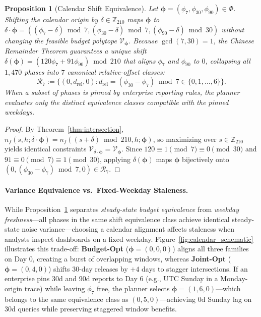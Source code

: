 \documentclass[sigconf, nonacm]{acmart}
\newtheorem{proposition}{Proposition}
\begin{document}
\begin{proposition}[Calendar Shift Equivalence]
\label{prop:orbits}
Let $\boldsymbol{\phi} = (\phi_7, \phi_{30}, \phi_{90}) \in \Phi$. Shifting the calendar origin by $\delta \in \mathbb{Z}_{210}$ maps $\boldsymbol{\phi}$ to $\delta \cdot \boldsymbol{\phi} = ((\phi_7 - \delta) \bmod 7, (\phi_{30} - \delta) \bmod 7, (\phi_{90} - \delta) \bmod 30)$ without changing the feasible budget polytope $\mathcal{V}_{\boldsymbol{\phi}}$. Because $\gcd(7, 30) = 1$, the Chinese Remainder Theorem guarantees a unique shift $\delta(\boldsymbol{\phi}) = (120\phi_7 + 91\phi_{90}) \bmod 210$ that aligns $\phi_7$ and $\phi_{90}$ to $0$, collapsing all $1{,}470$ phases into $7$ canonical relative-offset classes:
\[
\mathcal{R}_7 := \big\{(0, d_{\mathrm{rel}}, 0) : d_{\mathrm{rel}} = (\phi_{30} - \phi_7) \bmod 7 \in \{0, 1, \dots, 6\}\big\}.
\]
When a subset of phases is pinned by enterprise reporting rules, the planner evaluates only the distinct equivalence classes compatible with the pinned weekdays.
\end{proposition}
\begin{proof}
By Theorem~\ref{thm:intersection}, $n_f(s, h; \delta \cdot \boldsymbol{\phi}) = n_f((s + \delta) \bmod 210, h; \boldsymbol{\phi})$, so maximizing over $s \in \mathbb{Z}_{210}$ yields identical constraints $\mathcal{V}_{\delta \cdot \boldsymbol{\phi}} = \mathcal{V}_{\boldsymbol{\phi}}$. Since $120 \equiv 1 \pmod 7 \equiv 0 \pmod{30}$ and $91 \equiv 0 \pmod 7 \equiv 1 \pmod{30}$, applying $\delta(\boldsymbol{\phi})$ maps $\boldsymbol{\phi}$ bijectively onto $(0, (\phi_{30} - \phi_7) \bmod 7, 0) \in \mathcal{R}_7$.
\end{proof}

\paragraph{Variance Equivalence vs.\ Fixed-Weekday Staleness.}
While Proposition~\ref{prop:orbits} separates \emph{steady-state budget equivalence} from \emph{weekday freshness}---all phases in the same shift equivalence class achieve identical steady-state noise variance---choosing a calendar alignment affects staleness when analysts inspect dashboards on a fixed weekday. Figure~\ref{fig:calendar_schematic} illustrates this trade-off: \textbf{Budget-Opt} ($\boldsymbol{\phi}=(0,0,0)$) aligns all three families on Day 0, creating a burst of overlapping windows, whereas \textbf{Joint-Opt} ($\boldsymbol{\phi}=(0,4,0)$) shifts 30-day releases by $+4$ days to stagger intersections. If an enterprise pins 30d and 90d reports to Day 6 (e.g., UTC Sunday in a Monday-origin trace) while leaving $\phi_7$ free, the planner selects $\boldsymbol{\phi}=(1,6,0)$---which belongs to the same equivalence class as $(0,5,0)$---achieving $0\text{d}$ Sunday lag on 30d queries while preserving staggered window benefits.
\end{document}
